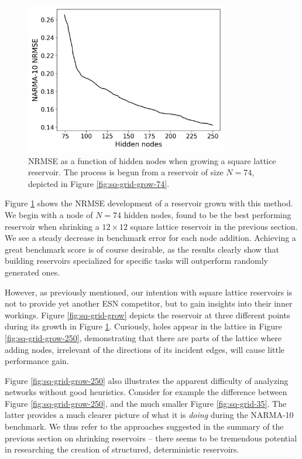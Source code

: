 \begin{figure}[htb]
  \centering
  \includegraphics[width=3.5in]{figures/grow-performance.png}
  \caption{
    NRMSE as a function of hidden nodes when growing a square lattice
reservoir. The process is begun from a reservoir of size $N = 74$, depicted in
Figure \protect\ref{fig:sq-grid-grow-74}.
  }
  \label{fig:sq-grow-performance}
\end{figure}

Figure \ref{fig:sq-grow-performance} shows the NRMSE development of a reservoir
grown with this method. We begin with a node of $N = 74$ hidden nodes, found to
be the best performing reservoir when shrinking a $12 \times 12$ square lattice
reservoir in the previous section. We see a steady decrease in benchmark error
for each node addition. Achieving a great benchmark score is of course
desirable, as the results clearly show that building reservoirs specialized for
specific tasks will outperform randomly generated ones.

However, as previously mentioned, our intention with square lattice reservoirs
is not to provide yet another ESN competitor, but to gain insights into their
inner workings. Figure \ref{fig:sq-grid-grow} depicts the reservoir at three
different points during its growth in Figure
\ref{fig:sq-grow-performance}. Curiously, holes appear in the lattice in Figure
\ref{fig:sq-grid-grow-250}, demonstrating that there are parts of the lattice
where adding nodes, irrelevant of the directions of its incident edges, will
cause little performance gain.

Figure \ref{fig:sq-grid-grow-250} also illustrates the apparent difficulty of
analyzing networks without good heuristics. Consider for example the difference
between Figure \ref{fig:sq-grid-grow-250}, and the much smaller Figure
\ref{fig:sq-grid-35}. The latter provides a much clearer picture of what it is
\textit{doing} during the NARMA-10 benchmark. We thus refer to the approaches
suggested in the summary of the previous section on shrinking reservoirs --
there seems to be tremendous potential in researching the creation of
structured, deterministic reservoirs.

